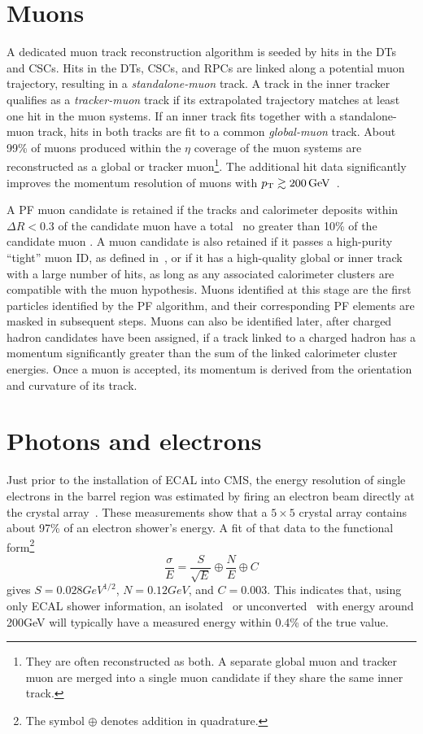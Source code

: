 \section{Muons} \label{sec:reconstruction_muons}
A dedicated muon track reconstruction algorithm is seeded by hits in the DTs and CSCs. Hits in the DTs, CSCs, and RPCs are linked along a potential muon trajectory,
resulting in a \textit{standalone-muon} track.
A track in the inner tracker qualifies as a \textit{tracker-muon} track if its extrapolated trajectory matches at least one hit in the muon systems.
If an inner track fits together with a standalone-muon track, hits in both tracks are fit to a common \textit{global-muon} track.
About 99\% of muons produced within the $\eta$ coverage of the muon systems are reconstructed as a global or tracker muon\footnote{They are often reconstructed
as both. A separate global muon and tracker muon are merged into a single muon candidate if they share the same inner track.}.
The additional hit data significantly improves the momentum resolution of muons with $\pT \gtrsim 200\unit{GeV}$~\cite{ref:1748-0221/12/10/P10003}.

A PF muon candidate is retained if the tracks and calorimeter deposits within $\Delta R < 0.3$ of the candidate muon have a total \pT\ no greater than 10\%
of the candidate muon \pT. A muon candidate is also retained if it passes a high-purity ``tight'' muon ID, as defined in~\cite{ref:1748-0221/7/10/P10002},
or if it has a high-quality global or inner track with a large number of hits, as long as any associated calorimeter clusters are compatible with the muon hypothesis.
Muons identified at this stage are the first particles identified by the PF algorithm, and their corresponding PF elements are masked in subsequent steps.
Muons can also be identified later, after charged hadron candidates have been assigned, if a track linked to a charged hadron has a momentum significantly greater than
the sum of the linked calorimeter cluster energies. Once a muon is accepted, its momentum is derived from the orientation and curvature of its track.

\section{Photons and electrons} \label{sec:reconstruction_egamma}
Just prior to the installation of ECAL into CMS, the energy resolution of single electrons in the barrel region was estimated
by firing an electron beam directly at the crystal array~\cite{ref:1748-0221/2/04/P04004}.
These measurements show that a $5{\times}5$ crystal array contains about 97\% of an electron shower's energy.
A fit of that data to the functional form\footnote{The symbol ${\oplus}$ denotes addition in quadrature.}
\begin{equation}
\frac{\sigma}{E} = \frac{S}{\sqrt{E}} \oplus \frac{N}{E} \oplus C
\label{eq:calo_resolution}
\end{equation}
gives $S = 0.028\unit{GeV^{1/2}}$, $N = 0.12\unit{GeV}$, and $C = 0.003$. This indicates that, using
only ECAL shower information, an isolated \Pe\ or unconverted \Pgamma\ with energy around 200\unit{GeV} will typically have a measured energy within 0.4\% of the true value.

